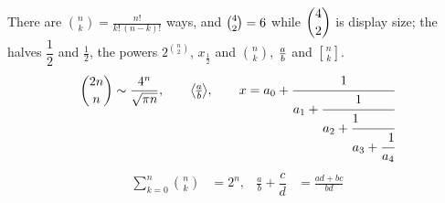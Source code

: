 \documentclass[12pt]{article}
\begin{document}
There are $\binom{n}{k} = \frac{n!}{k!\,(n-k)!}$ ways, and $\tbinom{4}{2}=6$ while $\dbinom{4}{2}$ is display size; the halves
$\dfrac{1}{2}$ and $\tfrac{1}{2}$, the powers $2^{\binom{n}{2}}$, $x_{\tfrac12}$ and ${n \choose k}$, ${a \over b}$ and $\genfrac{[}{]}{0pt}{}{n}{k}$.
\[ \binom{2n}{n} \sim \frac{4^n}{\sqrt{\pi n}}, \qquad \genfrac{\langle}{\rangle}{0.4pt}{1}{a}{b}, \qquad
   x = a_0 + \cfrac{1}{a_1 + \cfrac{1}{a_2 + \cfrac[l]{1}{a_3 + \cfrac[r]{1}{a_4}}}} \]
\begin{align}
  \sum_{k=0}^{n} \binom{n}{k} &= 2^n, & \tfrac{a}{b} + \dfrac{c}{d} &= \frac{ad + bc}{bd}
\end{align}
\end{document}
